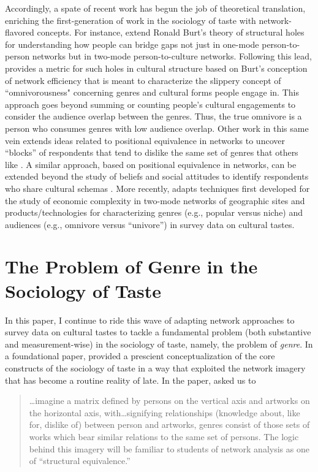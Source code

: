 \documentclass[a4paper,12pt]{article}
\begin{document}
Accordingly, a spate of recent work has begun the job of theoretical translation, enriching the first-generation of work in the sociology of taste with network-flavored concepts. For instance, \citet{pachucki2010cultural} extend Ronald Burt's theory of structural holes for understanding how people can bridge gaps not just in one-mode person-to-person networks but in two-mode person-to-culture networks. Following this lead, \citet{lizardo14} provides a metric for such holes in cultural structure based on Burt's conception of network efficiency that is meant to characterize the slippery concept of ``omnivorousness" concerning genres and cultural forms people engage in. This approach goes beyond summing or counting people's cultural engagements to consider the audience overlap between the genres. Thus, the true omnivore is a person who consumes genres with low audience overlap. Other work in this same vein extends ideas related to positional equivalence in networks \citep[see][]{breiger1976social} to uncover ``blocks'' of respondents that tend to dislike the same set of genres that others like \citep{okada2017structure}. A similar approach, based on positional equivalence in networks, can be extended beyond the study of beliefs and social attitudes to identify respondents who share cultural schemas \citep{goldberg2011mapping}. More recently, \citet{lizardo18} adapts techniques first developed for the study of economic complexity in two-mode networks of geographic sites and products/technologies \citep{hidalgo2009building} for characterizing genres (e.g., popular versus niche) and audiences (e.g., omnivore versus ``univore'') in survey data on cultural tastes. 

\section{The Problem of Genre in the Sociology of Taste}
In this paper, I continue to ride this wave of adapting network approaches to survey data on cultural tastes to tackle a fundamental problem (both substantive and measurement-wise) in the sociology of taste, namely, the problem of \textit{genre}. In a foundational paper, \citet{dimaggio1987classification} provided a prescient conceptualization of the core constructs of the sociology of taste in a way that exploited the network imagery that has become a routine reality of late. In the paper, \citet[244]{dimaggio1987classification} asked us to

\begin{quote}
   {\dots}imagine a matrix defined by persons on the vertical axis and artworks on the horizontal axis, with{\dots}signifying relationships (knowledge about, like for, dislike of) between person and artworks, genres consist of those sets of works which bear similar relations to the same set of persons. The logic behind this imagery will be familiar to students of network analysis as one of ``structural equivalence.''
\end{quote}
\end{document}

